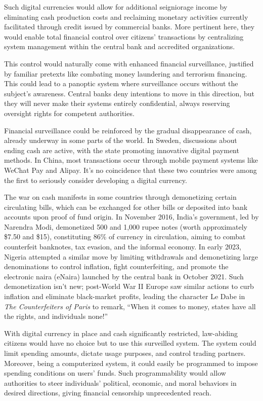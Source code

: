 \documentclass[
  a5paper,
  smalldemyvopaper,10pt,twoside,onecolumn,openright,extrafontsizes,hidelinks]{memoir}
\begin{document}
Such digital currencies would allow for additional seigniorage income by
eliminating cash production costs and reclaiming monetary activities
currently facilitated through credit issued by commercial banks. More
pertinent here, they would enable total financial control over citizens'
transactions by centralizing system management within the central bank
and accredited organizations.

This control would naturally come with enhanced financial surveillance,
justified by familiar pretexts like combating money laundering and
terrorism financing. This could lead to a panoptic system where
surveillance occurs without the subject's awareness. Central banks deny
intentions to move in this direction, but they will never make their
systems entirely confidential, always reserving oversight rights for
competent authorities.

Financial surveillance could be reinforced by the gradual disappearance
of cash, already underway in some parts of the world. In Sweden,
discussions about ending cash are active, with the state promoting
innovative digital payment methods. In China, most transactions occur
through mobile payment systems like WeChat Pay and Alipay. It's no
coincidence that these two countries were among the first to seriously
consider developing a digital currency.

The war on cash manifests in some countries through demonetizing certain
circulating bills, which can be exchanged for other bills or deposited
into bank accounts upon proof of fund origin. In November 2016, India's
government, led by Narendra Modi, demonetized 500 and 1,000 rupee notes
(worth approximately \$7.50 and \$15), constituting 86\% of currency in
circulation, aiming to combat counterfeit banknotes, tax evasion, and
the informal economy. In early 2023, Nigeria attempted a similar move by
limiting withdrawals and demonetizing large denominations to control
inflation, fight counterfeiting, and promote the electronic naira
(eNaira) launched by the central bank in October 2021. Such
demonetization isn't new; post-World War II Europe saw similar actions
to curb inflation and eliminate black-market profits, leading the
character Le Dabe in \emph{The Counterfeiters of Paris} to remark,
``When it comes to money, states have all the rights, and individuals
none!''

With digital currency in place and cash significantly restricted,
law-abiding citizens would have no choice but to use this surveilled
system. The system could limit spending amounts, dictate usage purposes,
and control trading partners. Moreover, being a computerized system, it
could easily be programmed to impose spending conditions on users'
funds. Such programmability would allow authorities to steer
individuals' political, economic, and moral behaviors in desired
directions, giving financial censorship unprecedented reach.
\end{document}
